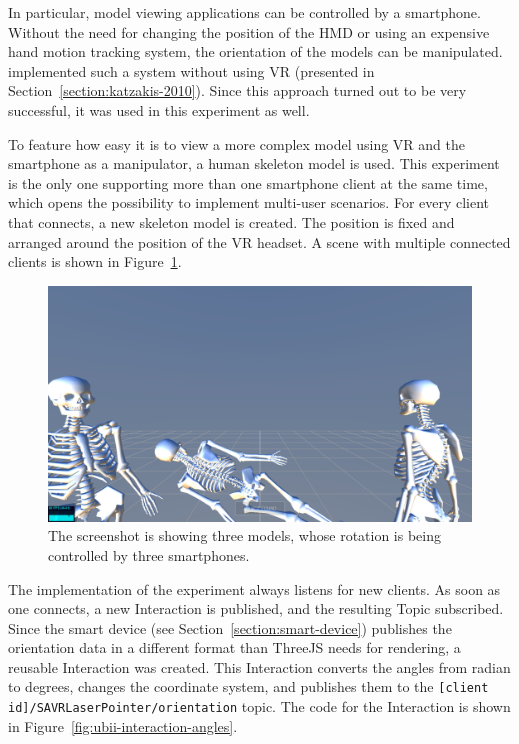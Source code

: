 In particular, model viewing applications can be controlled by a smartphone. Without the need for changing the position of the \gls{HMD} or using an expensive hand motion tracking system, the orientation of the models can be manipulated.
\citeauthor{Katzakis.2010} implemented such a system without using \gls{VR} (presented in Section~\ref{section:katzakis-2010}). Since this approach turned out to be very successful, it was used in this experiment as well.

To feature how easy it is to view a more complex model using \gls{VR} and the smartphone as a manipulator, a human skeleton model is used. This experiment is the only one supporting more than one smartphone client at the same time, which opens the possibility to implement multi-user scenarios. For every client that connects, a new skeleton model is created. The position is fixed and arranged around the position of the \gls{VR} headset. A scene with multiple connected clients is shown in Figure~\ref{fig:screenshot-exp-mv}.

\begin{figure}[H]
	\centering
	\includegraphics[width=12cm]{figures/experiments/screenshot_exp_mv.png}
	\caption[Screenshot of the model viewer]{The screenshot is showing three models, whose rotation is being controlled by three smartphones.}\label{fig:screenshot-exp-mv}
\end{figure}

The implementation of the experiment always listens for new clients. As soon as one connects, a new Interaction is published, and the resulting Topic subscribed. Since the smart device (see Section~\ref{section:smart-device}) publishes the orientation data in a different format than ThreeJS needs for rendering, a reusable Interaction was created. This Interaction converts the angles from radian to degrees, changes the coordinate system, and publishes them to the \lstinline[breaklines=true]{[client id]/SAVRLaserPointer/orientation} topic. The code for the Interaction is shown in Figure~\ref{fig:ubii-interaction-angles}.


